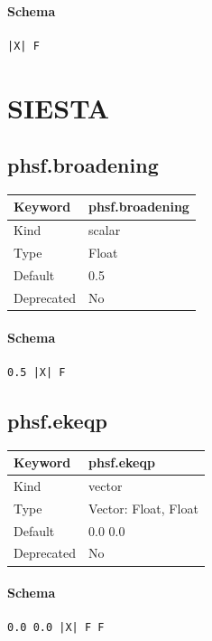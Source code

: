 \documentclass[11pt]{article}
\begin{document}
{{{{{\paragraph{Schema}
\begin{Verbatim}
|X| F
\end{Verbatim}

\section{SIESTA}

\subsection{phsf.broadening}
\label{kw:phsf-broadening}
\begin{longtable}{|p{1.5in}|p{4.5in}|}
\hline
Keyword & phsf.broadening \\
\hline
Kind & scalar \\
\hline
Type & Float \\
\hline
Default & 0.5 \\
\hline
Deprecated & No \\
\hline
\end{longtable}
\paragraph{Schema}
\begin{Verbatim}
0.5 |X| F
\end{Verbatim}

\subsection{phsf.ekeqp}
\label{kw:phsf-ekeqp}
\begin{longtable}{|p{1.5in}|p{4.5in}|}
\hline
Keyword & phsf.ekeqp \\
\hline
Kind & vector \\
\hline
Type & Vector: Float, Float \\
\hline
Default & 0.0 0.0 \\
\hline
Deprecated & No \\
\hline
\end{longtable}
\paragraph{Schema}
\begin{Verbatim}
0.0 0.0 |X| F F
\end{Verbatim}

}}}}}
\end{document}
